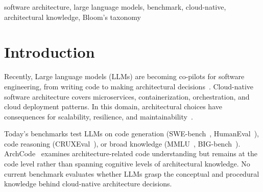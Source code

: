 \documentclass[conference]{IEEEtran}
\begin{document}
\begin{abstract}
  In today's software architecture, large language models (LLMs) serve as software architecture co-pilots. However, no benchmark currently exists to evaluate large language models' actual understanding of cloud-native software architecture. For this reason we present a benchmark called CAKE, which consists of 188 expert-validated questions covering four cognitive levels of Bloom's revised taxonomy---recall, analyze, design, and implement---and five cloud-native topics. Evaluation is conducted on 22 model configurations (0.5B--70B parameters) across four LLM families, using three-run majority voting for multiple-choice questions (MCQs) and LLM-as-a-judge scoring for free-responses (FR). Based on this evaluation, four notable findings were identified. First, MCQ accuracy plateaus above 3B parameters, with the best model reaching 99.2\%. Second, free-response scores scale steadily across all cognitive levels. Third, the two formats capture different facets of knowledge, as the MCQ accuracy approaches a ceiling while free-responses continue to differentiate models. Finally, reasoning augmentation (+think) improves free-response quality, while tool augmentation (+tool) degrades performance for small models. These results suggest that the evaluation format fundamentally shapes how we measure architectural knowledge in LLMs.

\end{abstract}

\begin{IEEEkeywords}
  software architecture, large language models, benchmark, cloud-native, architectural knowledge, Bloom's taxonomy
\end{IEEEkeywords}

\section{Introduction}

Recently, Large language models (LLMs) are becoming co-pilots for software engineering, from writing code to making architectural decisions~\cite{b12}. Cloud-native software architecture covers microservices, containerization, orchestration, and cloud deployment patterns. In this domain, architectural choices have consequences for scalability, resilience, and maintainability~\cite{b9,b10}.

Today's benchmarks test LLMs on code generation (SWE-bench~\cite{b1}, HumanEval~\cite{b2}), code reasoning (CRUXEval~\cite{b4}), or broad knowledge (MMLU~\cite{b5}, BIG-bench~\cite{b6}). ArchCode~\cite{b3} examines architecture-related code understanding but remains at the code level rather than spanning cognitive levels of architectural knowledge. No current benchmark evaluates whether LLMs grasp the conceptual and procedural knowledge behind cloud-native architecture decisions.
\end{document}
